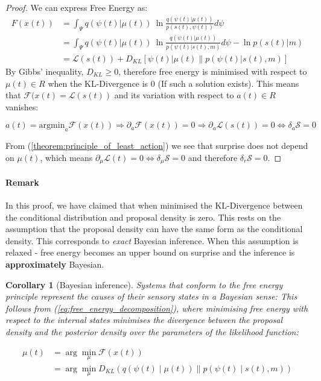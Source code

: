 \documentclass{article}
\newcommand{\refp}[1]{(\ref{#1})}
\newtheorem{corollary}{Corollary}
\begin{document}
\begin{proof}
	We can express Free Energy as:
	\begin{equation}\label{eq:free_energy_decomposition}
	\begin{aligned}
		F(x(t)) &= \int_\Psi q(\psi(t) | \mu(t))\ \ln\frac{q(\psi(t) | \mu(t))}{p(s(t), \psi(t))} d\psi \\
		&= \int_\Psi q(\psi(t) | \mu(t))\ \ln\frac{q(\psi(t) | \mu(t))}{p(\psi(t) | s(t), m)} d\psi - \ln p(s(t) | m) \\
		&= \mathcal{L}(s(t)) + D_{KL}\left[ \psi(t) | \mu(t) \| p(\psi(t) | s(t), m) \right]
	\end{aligned}
	\end{equation}
	By Gibbs' inequality, $D_{KL} \geq 0$, therefore free energy is minimised with respect to $\mu(t) \in R$ when the KL-Divergence is 0 (If such a solution exists). This means that $\mathcal{F}(x(t) = \mathcal{L}(s(t))$ and its variation with respect to $a(t) \in R$ vanishes:
	
	$$
	a(t) = \text{argmin}_a\mathcal{F}(x(t)) \Rightarrow \partial_a \mathcal{F}(x(t)) = 0 \Rightarrow \partial_a \mathcal{L}(s(t)) = 0 \Leftrightarrow \delta_a \mathcal{S} = 0
	$$
	
	From \refp{theorem:principle_of_least_action} we see that surprise does not depend on $\mu(t)$, which means $\partial_\mu \mathcal{L}(t) = 0 \Leftrightarrow \delta_\mu \mathcal{S} = 0$ and therefore $\delta_r \mathcal{S} = 0$.
	

\end{proof}

\paragraph{Remark} In this proof, we have claimed that when minimised the KL-Divergence between the conditional distribution and proposal density is zero. This rests on the assumption that the proposal density can have the same form as the conditional density. This corresponds to \textit{exact} Bayesian inference. When this assumption is relaxed - free energy becomes an upper bound on surprise and the inference is \textbf{approximately} Bayesian. 

\begin{corollary}[Bayesian inference]\label{cor:bayesian_inference}
	Systems that conform to the free energy principle represent the causes of their sensory states in a Bayesian sense: This follows from \refp{eq:free_energy_decomposition}, where minimising free energy with respect to the internal states minimises the divergence between the proposal density and the posterior density over the parameters of the likelihood function:
	
	\begin{align*}
		\mu(t) & =\arg \min _\mu \mathcal{F}(x(t)) \\
		& =\arg \min _\mu D_{K L}(q(\psi(t) \mid \mu(t)) \| p(\psi(t) \mid s(t), m))
	\end{align*}
\end{corollary}
\end{document}
